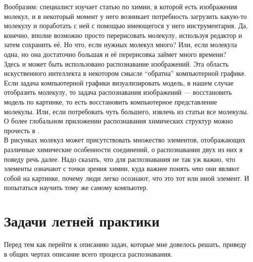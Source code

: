 \noindent Вообразим: специалист изучает статью по химии, в которой есть изображения молекул, и в некоторый момент у него возникает 
потребность загрузить какую-то молекулу и поработать с ней с помощью имеющегося у него инструментария. Да, конечно,
вполне возможно просто перерисовать молекулу, используя редактор и затем сохранить её. Но что, если нужных молекул много? 
Или, если молекула одна, но она достаточно большая и её перерисовка займет много времени? \\ 

\noindent 
Здесь и может быть использовано распознавание изображений. Эта область искуственного интеллекта в некотором смысле ``обратна'' 
компьютерной графике. Если задача компьютерной графики визуализировать модель, в нашем случае отобразить молекулу, то задача 
распознавания изображений --- восстановить модель по картинке, то есть восстановить компьютерное представление молекулы. Или, 
если потребовать чуть большего, извлечь из статьи все молекулы. О более глобальном приложении распознавания химических структур 
можно прочесть в \cite{pavlov}.\\

\noindent
В рисунках молекул может присутствовать множество элементов, отображающих различные химические особенности соединений,
о распознавании двух из них я поведу речь далее. Надо сказать, что для распознавания не так уж важно, что элементы означают с точки 
зрения химии, куда важнее понять \emph{что} они являют собой на картинке, почему люди легко осознают, что это тот или 
иной элемент. И попытаться научить тому же самому компьютер. 

\onecolumn

\section{Задачи летней практики}
\noindent
Перед тем как перейти к описанию задач, которые мне довелось решать, приведу в общих чертах описание всего процесса распознавания.

